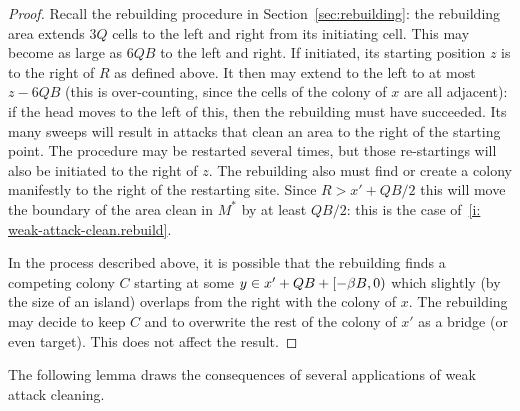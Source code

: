 \documentclass[11pt]{memoir}
\theoremstyle{definition} %
\def\B{B}
\newcommand{\Q}{Q} %
\begin{document}
\begin{proof}
Recall the rebuilding procedure in Section~\ref{sec:rebuilding}:
the rebuilding area extends \( 3\Q \) cells to the left and right from its initiating cell.
This may become as large as \( 6\Q\B \) to the left and right.
If initiated, its starting position \( z \) is to the right of \( R \) as defined above.
It then may extend to the left to at most \( z-6\Q\B \) (this is over-counting,
since the cells of the colony of \( x \) are all adjacent):
if the head moves to the left of this, then the rebuilding must have succeeded.
Its many sweeps will result in attacks that clean an area to the right of the starting point.
The procedure may be restarted several times, but those re-startings will also be initiated
to the right of \( z \).
The rebuilding also must find or create a colony manifestly to the right of the restarting site.
Since \( R>x'+\Q\B/2 \) this will move the boundary of the area clean in \( M^{*} \) 
by at least \( \Q\B/2 \): this is the case of~\eqref{i: weak-attack-clean.rebuild}.

In the process described above,
it is possible that the rebuilding finds a competing colony \( C \)
starting at some \( y \in x'+\Q\B + \lint{-\beta\B}{0}\) which
slightly (by the size of an island) overlaps from the right with the colony of \( x \).
The rebuilding may decide to keep \( C \) and to overwrite the rest of the colony of \( x' \) as a bridge
(or even target).
This does not affect the result.
\end{proof}

The following lemma draws the consequences of several applications of weak attack cleaning.
\end{document}
